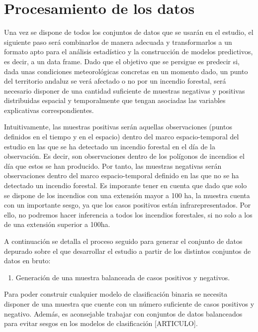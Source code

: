 \documentclass[12pt,a4paper,]{book}
\providecommand{\tightlist}{%
  \setlength{\itemsep}{0pt}\setlength{\parskip}{0pt}}
\numberwithin{dummy}{section}
\theoremstyle{ocrenumbox}
\theoremstyle{blacknumex}
\theoremstyle{blacknumbox}
\theoremstyle{ocrenum}
\theoremstyle{ocrenum}
\begin{document}
\hypertarget{procesamiento-de-los-datos}{%
\section{Procesamiento de los datos}\label{procesamiento-de-los-datos}}

Una vez se dispone de todos los conjuntos de datos que se usarán en el
estudio, el siguiente paso será combinarlos de manera adecuada y
transformarlos a un formato apto para el análisis estadístico y la
construcción de modelos predictivos, es decir, a un data frame. Dado que
el objetivo que se persigue es predecir si, dada unas condiciones
meteorológicas concretas en un momento dado, un punto del territorio
andaluz se verá afectado o no por un incendio forestal, será necesario
disponer de una cantidad suficiente de muestras negativas y positivas
distribuidas espacial y temporalmente que tengan asociadas las variables
explicativas correspondientes.

Intuitivamente, las muestras positivas serán aquellas observaciones
(puntos definidos en el tiempo y en el espacio) dentro del marco
espacio-temporal del estudio en las que se ha detectado un incendio
forestal en el día de la observación. Es decir, son observaciones dentro
de los polígonos de incendios el día que estos se han producido. Por
tanto, las muestras negativas serán observaciones dentro del marco
espacio-temporal definido en las que no se ha detectado un incendio
forestal. Es imporante tener en cuenta que dado que solo se dispone de
los incendios con una extensión mayor a 100 ha, la muestra cuenta con un
importante sesgo, ya que los casos positivos están infrarepresentados.
Por ello, no podremos hacer inferencia a todos los incendios forestales,
si no solo a los de una extensión superior a 100ha.

A continuación se detalla el proceso seguido para generar el conjunto de
datos depurado sobre el que desarrollar el estudio a partir de los
distintos conjuntos de datos en bruto:

\begin{enumerate}
\def\labelenumi{\arabic{enumi}.}
\tightlist
\item
  Generación de una muestra balanceada de casos positivos y negativos.
\end{enumerate}

Para poder construir cualquier modelo de clasificación binaria se
necesita disponer de una muestra que cuente con un número suficiente de
casos positivos y negativo. Además, es aconsejable trabajar con
conjuntos de datos balanceados para evitar sesgos en los modelos de
clasificación {[}ARTICULO{]}.
\end{document}
